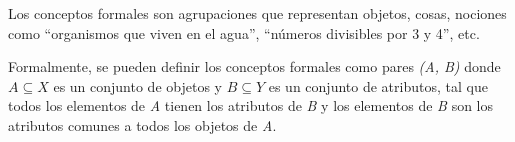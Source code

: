 \documentclass[12pt]{article}
\begin{document}
	Los conceptos formales son agrupaciones que representan objetos, cosas, nociones como “organismos que viven en el agua”, “números divisibles por 3 y 4”, etc.
	
	Formalmente, se pueden definir los conceptos formales como pares \textit{(A, B)} donde $A \subseteq X$ es un conjunto de objetos y $B \subseteq Y$ es un conjunto de atributos,  tal que todos los elementos de \textit{A} tienen los atributos de \textit{B} y los elementos de \textit{B} son los atributos comunes a todos los objetos de \textit{A}.
	
	

				
\end{document}
